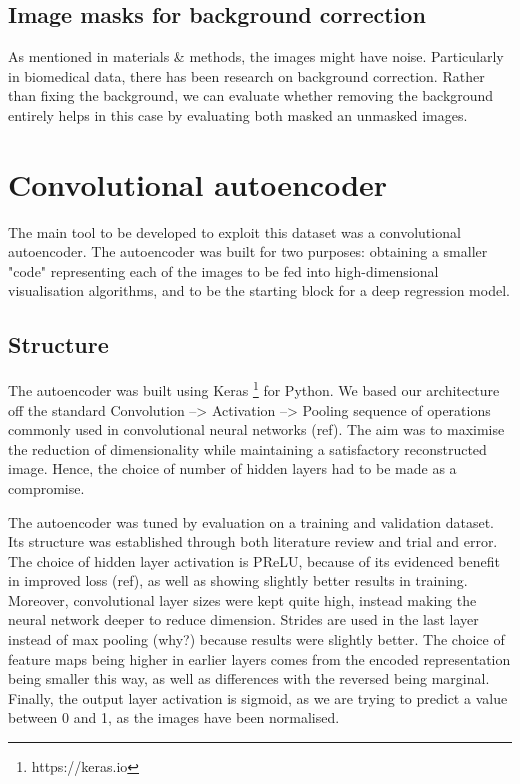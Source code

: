\documentclass{l4proj}
\begin{document}
\subsection{Image masks for background correction}
As mentioned in materials & methods, the images might have noise. Particularly in biomedical data, there has been research on background correction. Rather than fixing the background, we can evaluate whether removing the background entirely helps in this case by evaluating both masked an unmasked images.

\section{Convolutional autoencoder}

The main tool to be developed to exploit this dataset was a convolutional autoencoder. The autoencoder was built for two purposes: obtaining a smaller "code" representing each of the images to be fed into high-dimensional visualisation algorithms, and to be the starting block for a deep regression model.

\subsection{Structure}

The autoencoder was built using Keras \footnote{https://keras.io} for Python. We based our architecture off the standard Convolution --> Activation --> Pooling sequence of operations commonly used in convolutional neural networks (ref). The aim was to maximise the reduction of dimensionality while maintaining a satisfactory reconstructed image. Hence, the choice of number of hidden layers had to be made as a compromise.

The autoencoder was tuned by evaluation on a training and validation dataset. Its structure was established through both literature review and trial and error. The choice of hidden layer activation is PReLU, because of its evidenced benefit in improved loss (ref), as well as showing slightly better results in training. Moreover, convolutional layer sizes were kept quite high, instead making the neural network deeper to reduce dimension. Strides are used in the last layer instead of max pooling (why?) because results were slightly better. The choice of feature maps being higher in earlier layers comes from the encoded representation being smaller this way, as well as differences with the reversed being marginal. Finally, the output layer activation is sigmoid, as we are trying to predict a value between 0 and 1, as the images have been normalised.
\end{document}
